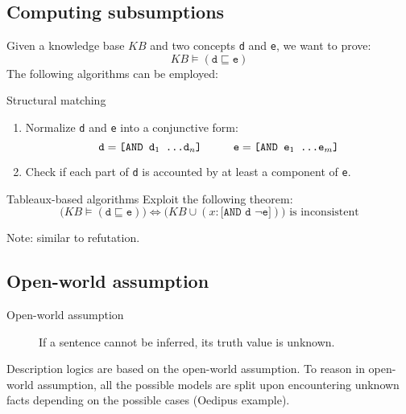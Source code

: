 \subsection{Computing subsumptions}

Given a knowledge base $KB$ and two concepts \texttt{d} and \texttt{e},
we want to prove:
\[ KB \models (\texttt{d} \sqsubseteq \texttt{e}) \]
The following algorithms can be employed:
\begin{descriptionlist}
    \item[Structural matching] 
        \phantom{}
        \begin{enumerate}
            \item Normalize \texttt{d} and \texttt{e} into a conjunctive form:
                \[ \texttt{d} = \texttt{[AND d$_1$ \dots d$_n$]} \hspace*{1cm} \texttt{e} = \texttt{[AND e$_1$ \dots e$_m$]} \]
            \item Check if each part of \texttt{d} is accounted by at least a component of \texttt{e}.
        \end{enumerate}
        
    \item[Tableaux-based algorithms] 
        Exploit the following theorem:
        \[ \big( KB \models (\texttt{d} \sqsubseteq \texttt{e}) \big) \iff 
            \big( KB \cup (x : \texttt{[AND d $\lnot$e]}) \big) \text{ is inconsistent} \]

        Note: similar to refutation.
\end{descriptionlist}


\subsection{Open-world assumption}

\begin{description}
    \item[Open-world assumption] 
        If a sentence cannot be inferred, its truth value is unknown.
\end{description}

Description logics are based on the open-world assumption.
To reason in open-world assumption, all the possible models are split upon encountering unknown facts
depending on the possible cases (Oedipus example).



